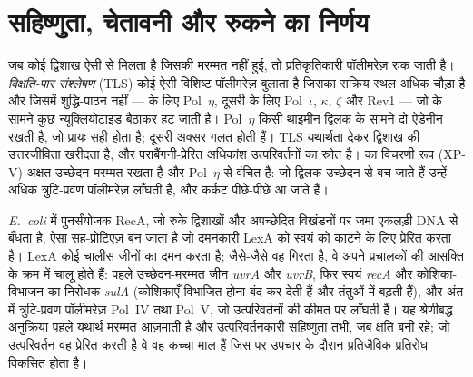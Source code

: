 \section{सहिष्णुता, चेतावनी और रुकने का निर्णय}

\begin{definition}[विक्षति-पार संश्लेषण]\label{def:b3:dna-repair:tls}
जब कोई द्विशाख ऐसी  से मिलता है जिसकी मरम्मत नहीं हुई, तो
प्रतिकृतिकारी पॉलीमरेज़ रुक जाती है। \emph{विक्षति-पार संश्लेषण} (TLS)
कोई ऐसी विशिष्ट पॉलीमरेज़ बुलाता है जिसका सक्रिय स्थल अधिक चौड़ा है और
जिसमें शुद्धि-पाठन नहीं ---  के लिए Pol~$\eta$, दूसरी
 के लिए Pol~$\iota$, $\kappa$, $\zeta$ और Rev1 --- जो 
के सामने कुछ न्यूक्लियोटाइड बैठाकर हट जाती है। Pol~$\eta$ किसी थाइमीन
द्विलक के सामने दो ऐडेनीन रखती है, जो प्रायः सही होता है; दूसरी अक्सर
गलत होती हैं। TLS यथार्थता देकर द्विशाख की उत्तरजीविता खरीदता है, और
पराबैंगनी-प्रेरित अधिकांश उत्परिवर्तनों का स्रोत है।  का विचरणी रूप (XP-V) अक्षत उच्छेदन मरम्मत रखता है और
Pol~$\eta$ से वंचित है: जो द्विलक उच्छेदन से बच जाते हैं उन्हें अधिक
त्रुटि-प्रवण पॉलीमरेज़ लाँघती हैं, और कर्कट पीछे-पीछे आ जाते हैं।
\end{definition}

\begin{proposition}[जीवाणुओं की SOS अनुक्रिया]\label{prop:b3:dna-repair:sos}
\emph{E.~coli} में पुनर्संयोजक RecA, जो रुके द्विशाखों और अपच्छेदित
विखंडनों पर जमा एकलड़ी DNA से बँधता है, ऐसा सह-प्रोटिएज़ बन जाता है जो
दमनकारी LexA को स्वयं को काटने के लिए प्रेरित करता है। LexA कोई चालीस
जीनों का दमन करता है; जैसे-जैसे वह गिरता है, वे अपने प्रचालकों की
आसक्ति के क्रम में चालू होते हैं: पहले उच्छेदन-मरम्मत जीन \emph{uvrA}
और \emph{uvrB}, फिर स्वयं \emph{recA} और कोशिका-विभाजन का निरोधक
\emph{sulA} (कोशिकाएँ विभाजित होना बंद कर देती हैं और तंतुओं में बढ़ती
हैं), और अंत में त्रुटि-प्रवण पॉलीमरेज़ Pol~IV तथा Pol~V, जो
उत्परिवर्तनों की कीमत पर  लाँघती हैं। यह श्रेणीबद्ध अनुक्रिया
पहले यथार्थ मरम्मत आज़माती है और उत्परिवर्तनकारी सहिष्णुता तभी, जब
क्षति बनी रहे; जो उत्परिवर्तन वह प्रेरित करती है वे वह कच्चा माल हैं
जिस पर उपचार के दौरान प्रतिजैविक प्रतिरोध विकसित होता है।
\end{proposition}

